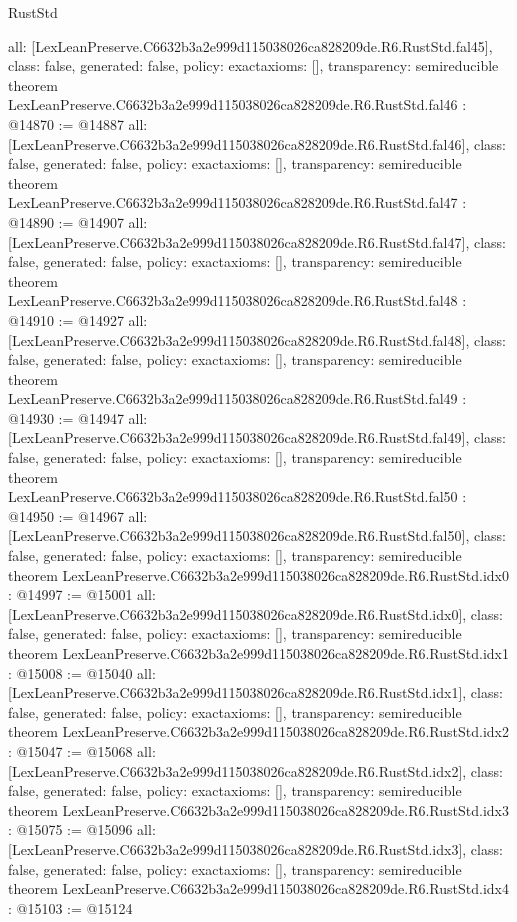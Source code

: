 \begin{lexlean}{RustStd}
\begin{coremodule}
{  all: [LexLeanPreserve.C6632b3a2e999d115038026ca828209de.R6.RustStd.fal45],
  class: false,
  generated: false,
  policy: exact{axioms: []},
  transparency: semireducible
}
theorem LexLeanPreserve.C6632b3a2e999d115038026ca828209de.R6.RustStd.fal46 : @14870 := @14887 {
  all: [LexLeanPreserve.C6632b3a2e999d115038026ca828209de.R6.RustStd.fal46],
  class: false,
  generated: false,
  policy: exact{axioms: []},
  transparency: semireducible
}
theorem LexLeanPreserve.C6632b3a2e999d115038026ca828209de.R6.RustStd.fal47 : @14890 := @14907 {
  all: [LexLeanPreserve.C6632b3a2e999d115038026ca828209de.R6.RustStd.fal47],
  class: false,
  generated: false,
  policy: exact{axioms: []},
  transparency: semireducible
}
theorem LexLeanPreserve.C6632b3a2e999d115038026ca828209de.R6.RustStd.fal48 : @14910 := @14927 {
  all: [LexLeanPreserve.C6632b3a2e999d115038026ca828209de.R6.RustStd.fal48],
  class: false,
  generated: false,
  policy: exact{axioms: []},
  transparency: semireducible
}
theorem LexLeanPreserve.C6632b3a2e999d115038026ca828209de.R6.RustStd.fal49 : @14930 := @14947 {
  all: [LexLeanPreserve.C6632b3a2e999d115038026ca828209de.R6.RustStd.fal49],
  class: false,
  generated: false,
  policy: exact{axioms: []},
  transparency: semireducible
}
theorem LexLeanPreserve.C6632b3a2e999d115038026ca828209de.R6.RustStd.fal50 : @14950 := @14967 {
  all: [LexLeanPreserve.C6632b3a2e999d115038026ca828209de.R6.RustStd.fal50],
  class: false,
  generated: false,
  policy: exact{axioms: []},
  transparency: semireducible
}
theorem LexLeanPreserve.C6632b3a2e999d115038026ca828209de.R6.RustStd.idx0 : @14997 := @15001 {
  all: [LexLeanPreserve.C6632b3a2e999d115038026ca828209de.R6.RustStd.idx0],
  class: false,
  generated: false,
  policy: exact{axioms: []},
  transparency: semireducible
}
theorem LexLeanPreserve.C6632b3a2e999d115038026ca828209de.R6.RustStd.idx1 : @15008 := @15040 {
  all: [LexLeanPreserve.C6632b3a2e999d115038026ca828209de.R6.RustStd.idx1],
  class: false,
  generated: false,
  policy: exact{axioms: []},
  transparency: semireducible
}
theorem LexLeanPreserve.C6632b3a2e999d115038026ca828209de.R6.RustStd.idx2 : @15047 := @15068 {
  all: [LexLeanPreserve.C6632b3a2e999d115038026ca828209de.R6.RustStd.idx2],
  class: false,
  generated: false,
  policy: exact{axioms: []},
  transparency: semireducible
}
theorem LexLeanPreserve.C6632b3a2e999d115038026ca828209de.R6.RustStd.idx3 : @15075 := @15096 {
  all: [LexLeanPreserve.C6632b3a2e999d115038026ca828209de.R6.RustStd.idx3],
  class: false,
  generated: false,
  policy: exact{axioms: []},
  transparency: semireducible
}
theorem LexLeanPreserve.C6632b3a2e999d115038026ca828209de.R6.RustStd.idx4 : @15103 := @15124 {
}
\end{coremodule}
\end{lexlean}
